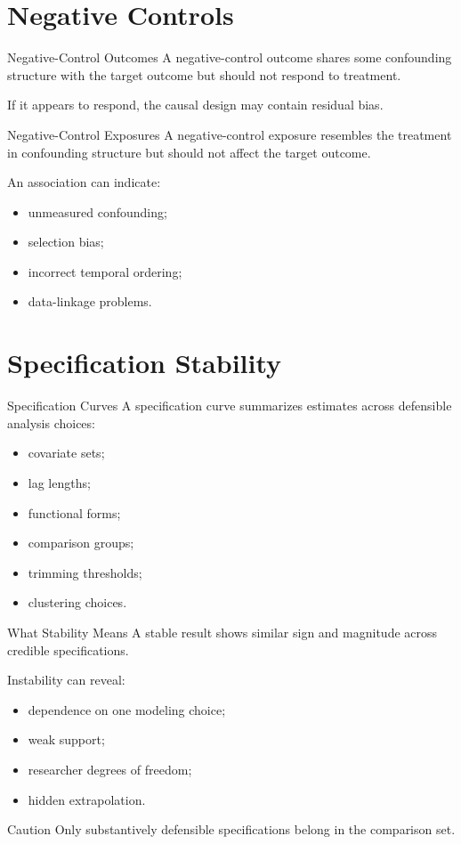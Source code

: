 \documentclass[aspectratio=169,11pt]{beamer}
\begin{document}
\section{Negative Controls}

\begin{frame}{Negative-Control Outcomes}
A negative-control outcome shares some confounding structure with the target outcome but should not respond to treatment.

If it appears to respond, the causal design may contain residual bias.
\end{frame}

\begin{frame}{Negative-Control Exposures}
A negative-control exposure resembles the treatment in confounding structure but should not affect the target outcome.

An association can indicate:
\begin{itemize}
\item unmeasured confounding;
\item selection bias;
\item incorrect temporal ordering;
\item data-linkage problems.
\end{itemize}
\end{frame}

\section{Specification Stability}

\begin{frame}{Specification Curves}
A specification curve summarizes estimates across defensible analysis choices:
\begin{itemize}
\item covariate sets;
\item lag lengths;
\item functional forms;
\item comparison groups;
\item trimming thresholds;
\item clustering choices.
\end{itemize}
\end{frame}

\begin{frame}{What Stability Means}
A stable result shows similar sign and magnitude across credible specifications.

Instability can reveal:
\begin{itemize}
\item dependence on one modeling choice;
\item weak support;
\item researcher degrees of freedom;
\item hidden extrapolation.
\end{itemize}

\begin{alertblock}{Caution}
Only substantively defensible specifications belong in the comparison set.
\end{alertblock}
\end{frame}
\end{document}
